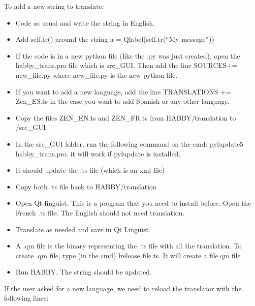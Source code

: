 \documentclass[letterpaper,10pt,english]{sphinxmanual}
\begin{document}
To add a new string to translate:
\begin{itemize}
\item {} 
Code as usual and write the string in English.

\item {} 
Add self.tr() around the string  a = Qlabel(self.tr(“My message”))

\item {} 
If the code is in a new python file (like the .py was just created), open the habby\_trans.pro file which is src\_GUI. Then add the line SOURCES+= new\_file.py where new\_file.py is the new python file.

\item {} 
If you want to add a new language, add the line TRANSLATIONS += Zen\_ES.ts in the case you want to add Spanish or any other language.

\item {} 
Copy the files ZEN\_EN.ts and ZEN\_FR.ts from HABBY/translation to /src\_GUI

\item {} 
In the src\_GUI folder, run the following command on the cmd: pylupdate5 habby\_trans.pro. it will work if pylupdate is installed.

\item {} 
It should update the .ts file (which is an xml file)

\item {} 
Copy both .ts file back to HABBY/translation

\item {} 
Open Qt  linguist. This is a program that you need to install before. Open the French .ts file. The English should not need translation.

\item {} 
Translate as needed and save in Qt Linguist.

\item {} 
A .qm file is the binary representing the .ts file with all the translation. To create .qm file, type (in the cmd) lrelease  file.ts. It will create a file.qm file

\item {} 
Run HABBY. The string should be updated.

\end{itemize}


If the user asked for a new language, we need to reload the translator with the following lines:
\begin{quote}



\end{quote}
\end{document}
